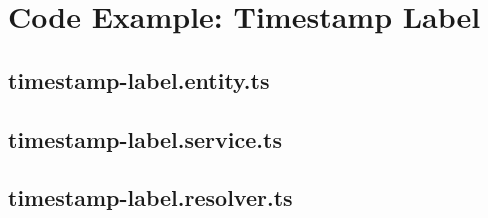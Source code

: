 \appendix
\section{Code Example: Timestamp Label}

\subsection{timestamp-label.entity.ts}\label{ex:tl-entity}



\subsection{timestamp-label.service.ts}\label{ex:tl-service}



\subsection{timestamp-label.resolver.ts}\label{ex:tl-resolver}

